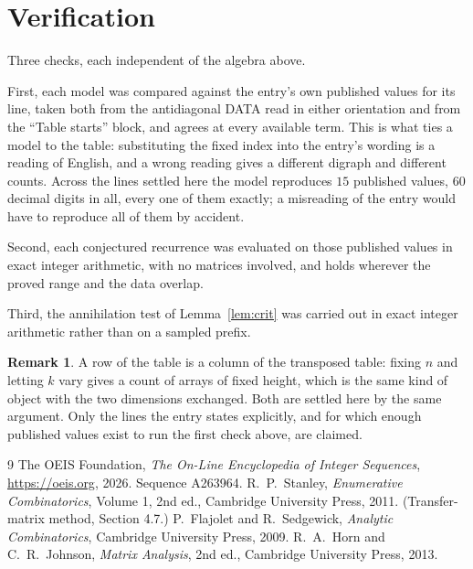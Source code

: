 \documentclass[11pt,a4paper]{article}
\theoremstyle{plain}
\theoremstyle{definition}
\newtheorem{remark}[theorem]{Remark}
\begin{document}
\section{Verification}

Three checks, each independent of the algebra above.

First, each model was compared against the entry's own published values for its line, taken
both from the antidiagonal DATA read in either orientation and from the ``Table starts''
block, and agrees at every available term. This is what ties a model to the table:
substituting the fixed index into the entry's wording is a reading of English, and a wrong
reading gives a different digraph and different counts. Across the lines settled here the
model reproduces $15$ published values, $60$ decimal digits in all, every one of
them exactly; a misreading of the entry would have to reproduce all of them by accident.

Second, each conjectured recurrence was evaluated on those published values in exact
integer arithmetic, with no matrices involved, and holds wherever the proved range and the
data overlap.

Third, the annihilation test of Lemma~\ref{lem:crit} was carried out in exact integer
arithmetic rather than on a sampled prefix.

\begin{remark}
A row of the table is a column of the transposed table: fixing $n$ and letting $k$ vary gives a
count of arrays of fixed height, which is the same kind of object with the two dimensions
exchanged. Both are settled here by the same argument. Only the lines the entry states
explicitly, and for which enough published values exist to run the first check above, are
claimed.
\end{remark}

\begin{thebibliography}{9}
 The OEIS Foundation, \emph{The On-Line Encyclopedia of Integer
Sequences}, \url{https://oeis.org}, 2026. Sequence A263964.
 R.~P.~Stanley, \emph{Enumerative Combinatorics}, Volume 1, 2nd ed.,
Cambridge University Press, 2011. (Transfer-matrix method, Section 4.7.)
 P.~Flajolet and R.~Sedgewick, \emph{Analytic Combinatorics}, Cambridge
University Press, 2009.
 R.~A.~Horn and C.~R.~Johnson, \emph{Matrix Analysis}, 2nd ed., Cambridge
University Press, 2013.
\end{thebibliography}
\end{document}
